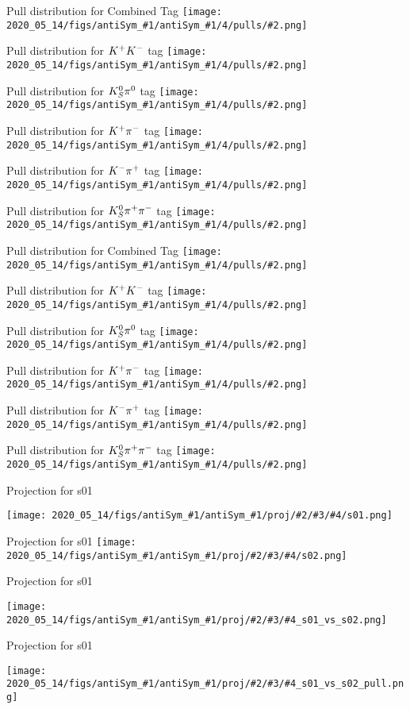 
\newcommand{\pull}[3]{
\begin{frame}{Pull distribution for #3}
\texttt{[image: 2020\_05\_14/figs/antiSym\_\#1/antiSym\_\#1/4/pulls/\#2.png]}
\end{frame}

}


\newcommand{\pulls}[1]{
    \pull{#1}{Comb}{Combined Tag}
    \pull{#1}{KK}{$\KK$ tag}
    \pull{#1}{Kspi0}{$\Kspiz$ tag}
    \pull{#1}{Kppim}{$\Kppim$ tag}
    \pull{#1}{Kmpip}{$\Kmpip$ tag} 
    \pull{#1}{Kspipi}{$\Kspipi$ tag}
}


\newcommand{\projod}[5]{
    \begin{frame}{Projection for #5}


        \texttt{[image: 2020\_05\_14/figs/antiSym\_\#1/antiSym\_\#1/proj/\#2/\#3/\#4/s01.png]}

    \end{frame}

    \begin{frame}{Projection for #5}
            \texttt{[image: 2020\_05\_14/figs/antiSym\_\#1/antiSym\_\#1/proj/\#2/\#3/\#4/s02.png]}

   

    \end{frame}
}

\newcommand{\projtd}[5]{
    \begin{frame}{Projection for #5}


                \texttt{[image: 2020\_05\_14/figs/antiSym\_\#1/antiSym\_\#1/proj/\#2/\#3/\#4\_s01\_vs\_s02.png]}

    \end{frame}
    \begin{frame}{Projection for #5}

                \texttt{[image: 2020\_05\_14/figs/antiSym\_\#1/antiSym\_\#1/proj/\#2/\#3/\#4\_s01\_vs\_s02\_pull.png]}


    \end{frame}

}

\newcommand{\allprojod}[3]{
    \projod{#1}{#2}{#3}{KK}{s01}
    \projod{#1}{#2}{#3}{Kspi0}{s01}
    \projod{#1}{#2}{#3}{Kppim}{s01}
    \projod{#1}{#2}{#3}{Kmpip}{s01}
    \projod{#1}{#2}{#3}{Kspipi}{s01}

}

\pulls{chebyshev}
\pulls{simple}
\projod{simple}{136}{0}{KK}{s01}
\projtd{simple}{136}{0}{KK}{s01}
